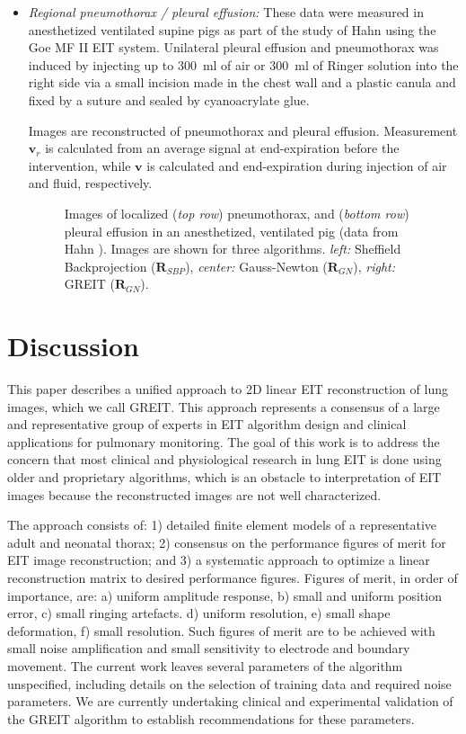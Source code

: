 \documentclass[12pt]{iopart}
\newcommand{\vB}{\mbox{$\mathbf{v}$}}
\newcommand{\RB}{\mbox{$\mathbf{R}$}}
\begin{document}
\begin{itemize}
\item
{\em Regional pneumothorax / pleural effusion:}
These data were measured in anesthetized
ventilated supine pigs as part of the
study of Hahn  using the
Goe MF II EIT system.
Unilateral pleural effusion and pneumothorax was
induced by injecting up to $300$~ml of air or $300$~ml of
Ringer solution into the right side via a small incision
made in the chest wall and a plastic canula and
fixed by a suture and sealed by cyanoacrylate glue.

Images are reconstructed of pneumothorax
and pleural effusion.
Measurement $\vB_r$ is calculated from an
average signal at end-expiration before
the intervention, while $\vB$ is calculated
and end-expiration during injection of air
and fluid, respectively.

\begin{figure}[bhtp]
\begin{center}
\caption{
\label{fig:Frerichs98images}
Images of localized
({\em top row})
pneumothorax, and
({\em bottom row})
pleural effusion
in an anesthetized, ventilated pig 
(data from Hahn ).
Images are shown for three algorithms.
{\em left:} Sheffield Backprojection ($\RB_{SBP}$),
{\em center:} Gauss-Newton ($\RB_{GN}$),
{\em right:} GREIT ($\RB_{GN}$).
}
\end{center}
\end{figure}


\end{itemize}


\section{Discussion}

This paper describes a unified approach to 2D linear EIT
reconstruction of lung images, which we call GREIT.
This approach represents
a consensus of a large and representative
group of experts in EIT algorithm design and clinical
applications for pulmonary monitoring. The goal of
this work is to address the concern that most
clinical and physiological research in lung EIT
is done using older and proprietary algorithms, which is
an obstacle to interpretation of EIT images because the
reconstructed images are not well characterized.

The approach consists of:
1) detailed finite element models of a representative
 adult and neonatal thorax;
2) consensus on the performance figures of merit for
 EIT image reconstruction;
and
3) a systematic approach to optimize a linear reconstruction
 matrix to desired performance figures.
Figures of merit, in order of importance, are:
a) uniform amplitude response,
b) small and uniform position error,
c) small ringing artefacts.
d) uniform resolution,
e) small shape deformation,
f) small resolution.
Such figures of merit are to be achieved with
small noise amplification and
small sensitivity to electrode and boundary movement.
The current work leaves several parameters of the algorithm
unspecified, including details on the selection of training
data and required noise parameters. We are currently undertaking
clinical and experimental validation of the GREIT algorithm
to establish recommendations for these parameters.
\end{document}

